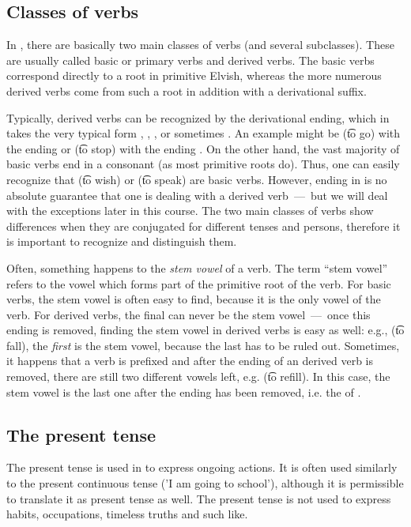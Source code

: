 \subsection{Classes of verbs}
In \quenya, there are basically two main classes of verbs (and several
subclasses). These are usually called basic or primary verbs and derived verbs.
The basic verbs correspond directly to a root in primitive Elvish, whereas the
more numerous derived verbs come from such a root in addition with a
derivational suffix.

Typically, derived verbs can be recognized by the derivational ending, which in
\quenya takes the very typical form , , ,  or
sometimes .
An example might be  (\t{to go}) with the ending  or
 (\t{to stop}) with the ending . On the other hand, the vast
majority of basic verbs end in a consonant (as most primitive roots do).
Thus, one can easily recognize that  (\t{to wish}) or 
(\t{to speak}) are basic verbs. However, ending in  is no absolute
guarantee that one is dealing with a derived verb~---~but we will deal with the
exceptions later in this course.
The two main classes of verbs show differences when they are conjugated for
different tenses and persons, therefore it is important to recognize and
distinguish them.

Often, something happens to the \emph{stem vowel} of a verb. The term ``stem
vowel'' refers to the vowel which forms part of the primitive root of the verb. For
basic verbs, the stem vowel is often easy to find, because it is the only vowel
of the verb. For derived verbs, the final  can never be the stem
vowel~---~once this ending is removed, finding the stem vowel in derived verbs 
is easy as well:
e.g.,  (\t{to fall}), the \emph{first}  is the stem vowel,
because the last  has to be ruled out. Sometimes, it happens that a verb is prefixed
and after the ending of an derived verb is removed, there are still two different vowels left,
e.g.  (\t{to refill}). In this case, the stem vowel is the last one
after the ending has been removed, i.e. the  of .

\subsection{The present tense}
The present tense is used in \quenya to express ongoing actions. It is often
used similarly to the present continuous tense (’I am going to
school’), although it is permissible to translate it as present tense as well.
The \quenya present tense is not used to express habits, occupations, timeless
truths and such like.


